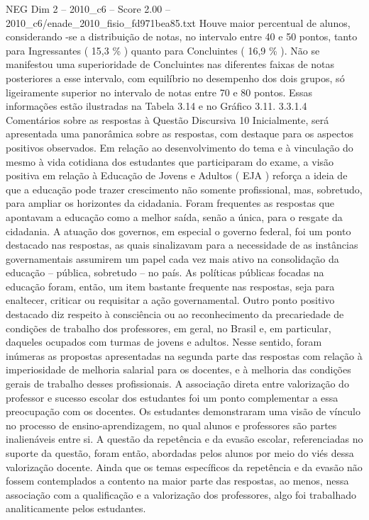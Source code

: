 \begin{textsample}{NEG Dim 2 – 2010\_c6 – Score 2.00 – 2010\_c6/enade\_2010\_fisio\_fd971bea85.txt}
Houve maior percentual de alunos, considerando -se a distribuição de notas, no intervalo entre 40 e 50 pontos, tanto para Ingressantes ( 15,3 \% ) quanto para Concluintes ( 16,9 \% ).
Não se manifestou uma superioridade de Concluintes nas diferentes faixas de notas posteriores a esse intervalo, com equilíbrio no desempenho dos dois grupos, só ligeiramente superior no intervalo de notas entre 70 e 80 pontos.
Essas informações estão ilustradas na Tabela 3.14 e no Gráfico 3.11. 3.3.1.4 Comentários sobre as respostas à Questão Discursiva 10 Inicialmente, será apresentada uma panorâmica sobre as respostas, com destaque para os aspectos positivos observados.
Em relação ao desenvolvimento do tema e à vinculação do mesmo à vida cotidiana dos estudantes que participaram do exame, a visão positiva em relação à Educação de Jovens e Adultos ( EJA ) reforça a ideia de que a educação pode trazer crescimento não somente profissional, mas, sobretudo, para ampliar os horizontes da cidadania.
Foram frequentes as respostas que apontavam a educação como a melhor saída, senão a única, para o resgate da cidadania.
A atuação dos governos, em especial o governo federal, foi um ponto destacado nas respostas, as quais sinalizavam para a necessidade de as instâncias governamentais assumirem um papel cada vez mais ativo na consolidação da educação – pública, sobretudo – no país.
As políticas públicas focadas na educação foram, então, um item bastante frequente nas respostas, seja para enaltecer, criticar ou requisitar a ação governamental.
Outro ponto positivo destacado diz respeito à consciência ou ao reconhecimento da precariedade de condições de trabalho dos professores, em geral, no Brasil e, em particular, daqueles ocupados com turmas de jovens e adultos.
Nesse sentido, foram inúmeras as propostas apresentadas na segunda parte das respostas com relação à imperiosidade de melhoria salarial para os docentes, e à melhoria das condições gerais de trabalho desses profissionais.
A associação direta entre valorização do professor e sucesso escolar dos estudantes foi um ponto complementar a essa preocupação com os docentes.
Os estudantes demonstraram uma visão de vínculo no processo de ensino-aprendizagem, no qual alunos e professores são partes inalienáveis entre si.
A questão da repetência e da evasão escolar, referenciadas no suporte da questão, foram então, abordadas pelos alunos por meio do viés dessa valorização docente.
Ainda que os temas específicos da repetência e da evasão não fossem contemplados a contento na maior parte das respostas, ao menos, nessa associação com a qualificação e a valorização dos professores, algo foi trabalhado analiticamente pelos estudantes.

\end{textsample}
